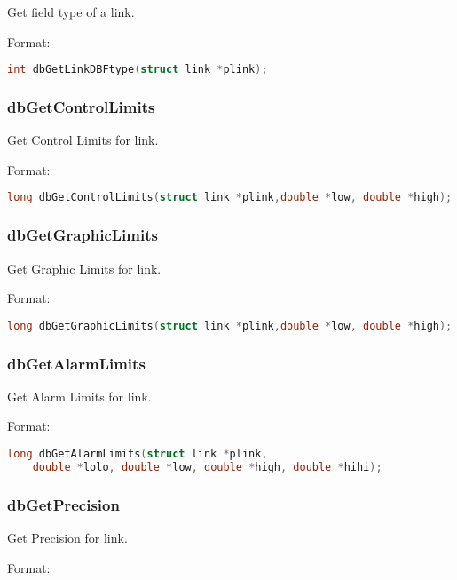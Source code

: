 Get field type of a link.

Format:

\begin{lstlisting}[language=C]
int dbGetLinkDBFtype(struct link *plink);
\end{lstlisting}

\subsubsection{dbGetControlLimits}

Get Control Limits for link.

Format:

\begin{lstlisting}[language=C]
long dbGetControlLimits(struct link *plink,double *low, double *high);
\end{lstlisting}

\subsubsection{dbGetGraphicLimits}

Get Graphic Limits for link.

Format:

\begin{lstlisting}[language=C]
long dbGetGraphicLimits(struct link *plink,double *low, double *high);
\end{lstlisting}

\subsubsection{dbGetAlarmLimits}

Get Alarm Limits for link.

Format:

\begin{lstlisting}[language=C]
long dbGetAlarmLimits(struct link *plink,
    double *lolo, double *low, double *high, double *hihi);
\end{lstlisting}

\subsubsection{dbGetPrecision}

Get Precision for link.

Format:


